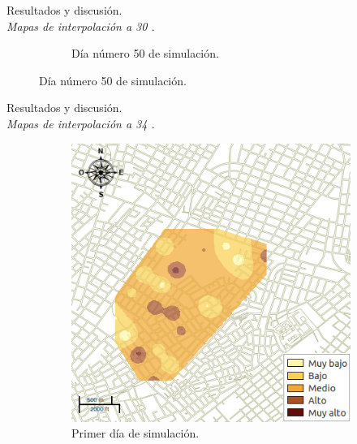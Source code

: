 \begin{frame}[t]{Resultados y discusión.\\\textit{Mapas de interpolación a 30 \textcelsius.}}
\begin{figure}
\begin{subfigure}[b]{0.45\textwidth}
        \caption{Día número 50 de simulación.}
    \end{subfigure}
    \end{figure}
\end{frame}


\begin{frame}[t]{Resultados y discusión.\\\textit{Mapas de interpolación a 34 \textcelsius.}}
    \begin{figure}
    \begin{subfigure}[b]{0.45\textwidth}
        \includegraphics[width=\textwidth]{../book/capitulo-6/graphics/raster/temp-34-0.png}
        \caption{ Primer día de simulación.}
    \end{subfigure}
    ~~~~
    \begin{subfigure}[b]{0.45\textwidth}

\end{subfigure}
\end{figure}
\end{frame}

